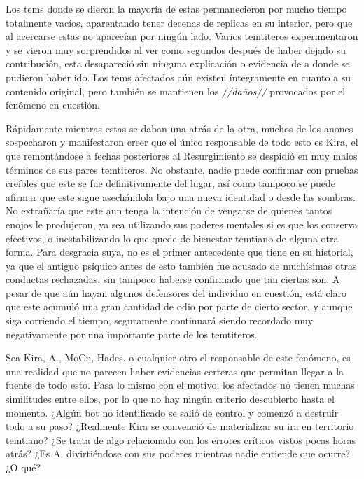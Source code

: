 \documentclass[
  spanish,
]{book}
\begin{document}
Los tems donde se dieron la mayoría de estas permanecieron por mucho tiempo totalmente vacíos, aparentando tener decenas de replicas en su interior, pero que al acercarse estas no aparecían por ningún lado. Varios temtiteros experimentaron y se vieron muy sorprendidos al ver como segundos después de haber dejado su contribución, esta desapareció sin ninguna explicación o evidencia de a donde se pudieron haber ido. Los tems afectados aún existen íntegramente en cuanto a su contenido original, pero también se mantienen los \emph{//daños//} provocados por el fenómeno en cuestión.

Rápidamente mientras estas se daban una atrás de la otra, muchos de los anones sospecharon y manifestaron creer que el único responsable de todo esto es Kira, el que remontándose a fechas posteriores al Resurgimiento se despidió en muy malos términos de sus pares temtiteros.
No obstante, nadie puede confirmar con pruebas creíbles que este se fue definitivamente del lugar, así como tampoco se puede afirmar que este sigue asechándola bajo una nueva identidad o desde las sombras.
No extrañaría que este aun tenga la intención de vengarse de quienes tantos enojos le produjeron, ya sea utilizando sus poderes mentales si es que los conserva efectivos, o inestabilizando lo que quede de bienestar temtiano de alguna otra forma. Para desgracia suya, no es el primer antecedente que tiene en su historial, ya que el antiguo psíquico antes de esto también fue acusado de muchísimas otras conductas rechazadas, sin tampoco haberse confirmado que tan ciertas son. A pesar de que aún hayan algunos defensores del individuo en cuestión, está claro que este acumuló una gran cantidad de odio por parte de cierto sector, y aunque siga corriendo el tiempo, seguramente continuará siendo recordado muy negativamente por una importante parte de los temtiteros.

Sea Kira, A., MoCn, Hades, o cualquier otro el responsable de este fenómeno, es una realidad que no parecen haber evidencias certeras que permitan llegar a la fuente de todo esto.
Pasa lo mismo con el motivo, los afectados no tienen muchas similitudes entre ellos, por lo que no hay ningún criterio descubierto hasta el momento. ¿Algún bot no identificado se salió de control y comenzó a destruir todo a su paso? ¿Realmente Kira se convenció de materializar su ira en territorio temtiano? ¿Se trata de algo relacionado con los errores críticos vistos pocas horas atrás? ¿Es A. divirtiéndose con sus poderes mientras nadie entiende que ocurre? ¿O qué?
\end{document}
